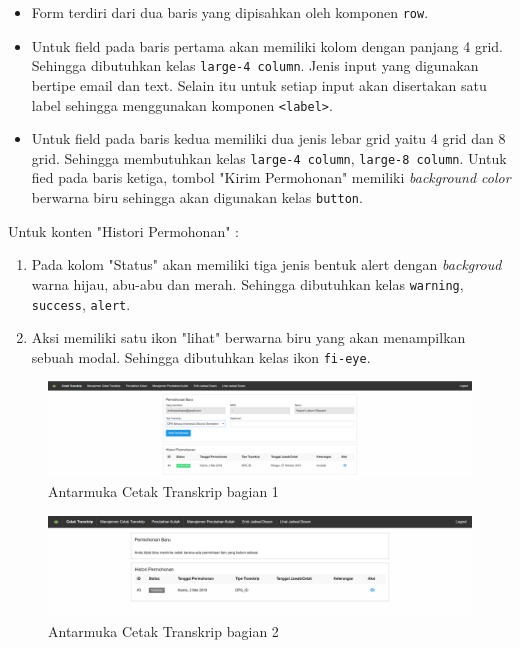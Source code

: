 \documentclass[a4paper,twoside]{article}
\begin{document}
\begin{enumerate}
\begin{itemize}
			\item Form terdiri dari dua baris yang dipisahkan oleh komponen \texttt{row}.
			\item Untuk field pada baris pertama akan memiliki kolom dengan panjang 4 grid. Sehingga dibutuhkan kelas \verb|large-4 column|. Jenis input yang digunakan bertipe email dan text. Selain itu untuk setiap input akan disertakan satu label sehingga menggunakan komponen \texttt{<label>}.
			\item Untuk field pada baris kedua memiliki dua jenis lebar grid yaitu 4 grid dan 8 grid. Sehingga membutuhkan kelas \verb|large-4 column|, \verb|large-8 column|. Untuk fied pada baris ketiga, tombol "Kirim Permohonan" memiliki \textit{background color} berwarna biru sehingga akan digunakan kelas \verb|button|.
		\end{itemize}
		Untuk konten "Histori Permohonan" :
		\begin{enumerate}	
			\item Pada kolom "Status" akan memiliki tiga jenis bentuk alert dengan \textit{backgroud} warna hijau, abu-abu dan merah. Sehingga dibutuhkan kelas \verb|warning|, \verb|success|, \verb|alert|.
			\item Aksi memiliki satu ikon "lihat" berwarna biru yang akan menampilkan sebuah modal. Sehingga dibutuhkan kelas ikon \verb|fi-eye|.
		\end{enumerate}
		\begin{figure} [H]
			\centering  
			\includegraphics[scale=0.5]{Tampilan-Mahasiswa-Cetak-Transkrip.png}  
			\caption{Antarmuka Cetak Transkrip bagian 1} 
		\end{figure}
		\begin{figure} [H]
			\centering  
			\includegraphics[scale=0.5]{Tampilan-Cetak-Transkrip.png}  
			\caption{Antarmuka Cetak Transkrip bagian 2} 
		\end{figure}

\end{enumerate}
\end{document}
